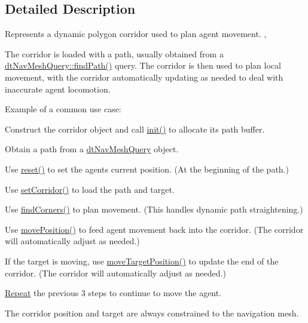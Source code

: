 \subsection{Detailed Description}
Represents a dynamic polygon corridor used to plan agent movement. ,

\begin{DoxyParagraph}{}

\end{DoxyParagraph}
The corridor is loaded with a path, usually obtained from a \hyperlink{classdtNavMeshQuery_a9d86502949fcd4f96ffd350d4ef69e3c}{dt\+Nav\+Mesh\+Query\+::find\+Path()} query. The corridor is then used to plan local movement, with the corridor automatically updating as needed to deal with inaccurate agent locomotion.

Example of a common use case\+:


\begin{DoxyEnumerate}
\item Construct the corridor object and call \hyperlink{classdtPathCorridor_a85b4c98157b68a57b9c3302f45d0ed7f}{init()} to allocate its path buffer.
\item Obtain a path from a \hyperlink{classdtNavMeshQuery}{dt\+Nav\+Mesh\+Query} object.
\item Use \hyperlink{classdtPathCorridor_abe057e7b5e1d6677e3d9eadb558df2b0}{reset()} to set the agent\textquotesingle{}s current position. (At the beginning of the path.)
\item Use \hyperlink{classdtPathCorridor_af26a1205a7e38f0389a2dcb2dc23ca9b}{set\+Corridor()} to load the path and target.
\item Use \hyperlink{classdtPathCorridor_aa1076957ddf987a274a756fbf8202cab}{find\+Corners()} to plan movement. (This handles dynamic path straightening.)
\item Use \hyperlink{classdtPathCorridor_a320a804c422fdb9b58f677b9b42ebf22}{move\+Position()} to feed agent movement back into the corridor. (The corridor will automatically adjust as needed.)
\item If the target is moving, use \hyperlink{classdtPathCorridor_a66f8097a4f49c077b6c6da5c727c6877}{move\+Target\+Position()} to update the end of the corridor. (The corridor will automatically adjust as needed.)
\item \hyperlink{classRepeat}{Repeat} the previous 3 steps to continue to move the agent.
\end{DoxyEnumerate}

The corridor position and target are always constrained to the navigation mesh.

